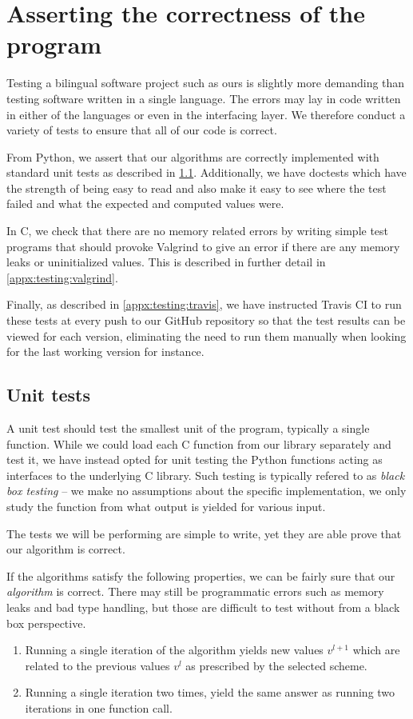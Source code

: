 \section{Asserting the correctness of the program}
\label{appx:testing}

Testing a bilingual software project such as ours is slightly more demanding than testing software written in a single language. The errors may lay in code written in either of the languages or even in the interfacing layer. We therefore conduct a variety of tests to ensure that all of our code is correct.

From Python, we assert that our algorithms are correctly implemented with standard unit tests as described in \ref{appx:testing:unit_tests}. Additionally, we have doctests which have the strength of being easy to read and also make it easy to see where the test failed and what the expected and computed values were.

In C, we check that there are no memory related errors by writing simple test programs that should provoke Valgrind to give an error if there are any memory leaks or uninitialized values. This is described in further detail in \ref{appx:testing:valgrind}.

Finally, as described in \ref{appx:testing:travis}, we have instructed Travis CI to run these tests at every push to our GitHub repository so that the test results can be viewed for each version, eliminating the need to run them manually when looking for the last working version for instance.

\subsection{Unit tests}
\label{appx:testing:unit_tests}
A unit test should test the smallest unit of the program, typically a single function. While we could load each C function from our library separately and test it, we have instead opted for unit testing the Python functions acting as interfaces to the underlying C library. Such testing is typically refered to as \emph{black box testing} -- we make no assumptions about the specific implementation, we only study the function from what output is yielded for various input.

The tests we will be performing are simple to write, yet they are able prove that our algorithm is correct.

If the algorithms satisfy the following properties, we can be fairly sure that our \emph{algorithm} is correct. There may still be programmatic errors such as memory leaks and bad type handling, but those are difficult to test without from a black box perspective.
\begin{enumerate}[label=(\roman*)]
    \item Running a single iteration of the algorithm yields new values $v^{l+1}$ which are related to the previous values $v^l$ as prescribed by the selected scheme. \label{lst:prop1}
    \item Running a single iteration two times, yield the same answer as running two iterations in one function call.\label{lst:prop2}
\end{enumerate}

